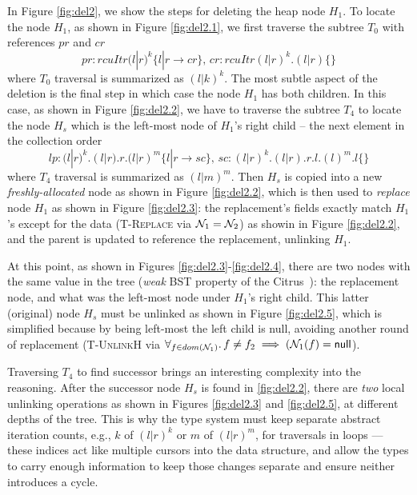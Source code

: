 In Figure \ref{fig:del2}, we show the steps for deleting the heap node $H_1$. To locate the node $H_1$, as shown in Figure \ref{fig:del2.1}, we first traverse the subtree $T_0$ with references $pr$ and $cr$
\[ pr:rcuItr(l|r)^{k} \{l|r \rightarrow cr\},\, cr:rcuItr(l|r)^{k}.(l|r) \{\}\]
where $T_0$ traversal is summarized as $(l|k)^{k}$. The most subtle aspect of the deletion is the final step in which case the node $H_1$ has both children. In this case, as shown in Figure \ref{fig:del2.2}, we have to traverse the subtree $T_4$ to locate the node $H_s$ which is the left-most node of $H_1$'s right child -- the next element in the collection order 
\[lp:(l|r)^{k}.(l|r).r.(l|r)^{m} \{l|r \rightarrow sc\},\, sc:(l|r)^{k}.(l|r).r.l.(l)^{m}.l\{\}\]
where $T_4$ traversal is summarized as $(l|m)^{m}$. Then $H_s$ is copied into a new \textit{freshly-allocated} node as shown in Figure \ref{fig:del2.2}, which is then used to \emph{replace} node $H_1$ as shown in Figure \ref{fig:del2.3}: the replacement's fields exactly match $H_1$'s except for the data (\textsc{T-Replace} via $\mathcal{N}_1 = \mathcal{N}_2$) as showin in Figure \ref{fig:del2.2}, and the parent is updated to reference the replacement, unlinking $H_1$.

At this point, as shown in Figures \ref{fig:del2.3}-\ref{fig:del2.4}, there are two nodes with the same value in the tree (\textit{weak} BST property of the Citrus~\cite{Arbel:2014:CUR:2611462.2611471}): the replacement node, and what was the left-most node under $H_1$'s right child. This latter (original) node $H_s$ must be unlinked as shown in Figure \ref{fig:del2.5}, which is simplified because by being left-most the left child is null, avoiding another round of replacement (\textsc{T-UnlinkH} via $\forall_{f\in dom(\mathcal{N}_1)} \ldotp f\neq f_2 \implies (\mathcal{N}_1(f) = \textsf{null}$).

Traversing $T_4$ to find successor brings an interesting complexity into the reasoning. After the successor node $H_s$ is found in \ref{fig:del2.2}, there are \emph{two} local unlinking operations as shown in Figures \ref{fig:del2.3} and \ref{fig:del2.5}, at different depths of the tree.  This is why the type system must keep separate abstract iteration counts, e.g., $k$ of $(l|r)^{k}$ or $m$ of $(l|r)^{m}$, for traversals in loops --- these indices act like multiple cursors into the data structure, and allow the types to carry enough information to keep those changes separate and ensure neither introduces a cycle.

